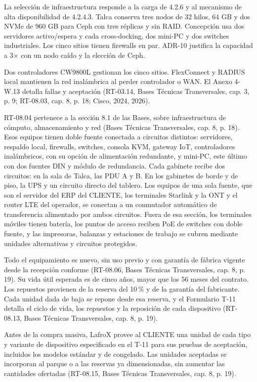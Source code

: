 La selección de infraestructura responde a la carga de 4.2.6 y al mecanismo de alta disponibilidad de 4.2.4.3. Talca conserva tres nodos de 32 hilos, 64 GB y dos NVMe de 960 GB para Ceph con tres réplicas y sin RAID. Concepción usa dos servidores activo/espera y cada cross-docking, dos mini-PC y dos switches industriales. Los cinco sitios tienen firewalls en par. ADR-10 justifica la capacidad a 3$\times$ con un nodo caído y la elección de Ceph.

Dos controladores CW9800L gestionan los cinco sitios. FlexConnect y RADIUS local mantienen la red inalámbrica al perder controlador o WAN. El Anexo 4-W.13 detalla fallas y aceptación (RT-03.14, Bases Técnicas Transversales, cap. 3, p. 9; RT-08.03, cap. 8, p. 18; Cisco, 2024, 2026).

RT-08.04 pertenece a la sección 8.1 de las Bases, sobre infraestructura de cómputo, almacenamiento y red (Bases Técnicas Transversales, cap. 8, p. 18). Esos equipos tienen doble fuente conectada a circuitos distintos: servidores, respaldo local, firewalls, switches, consola KVM, gateway IoT, controladores inalámbricos, con su opción de alimentación redundante, y mini-PC, este último con dos fuentes DIN y módulo de redundancia. Cada gabinete recibe dos circuitos: en la sala de Talca, las PDU A y B. En los gabinetes de borde y de piso, la UPS y un circuito directo del tablero. Los equipos de una sola fuente, que son el servidor del ERP del CLIENTE, los terminales Starlink y la ONT y el router LTE del operador, se conectan a un conmutador automático de transferencia alimentado por ambos circuitos. Fuera de esa sección, los terminales móviles tienen batería, los puntos de acceso reciben PoE de switches con doble fuente, y las impresoras, balanzas y estaciones de trabajo se cubren mediante unidades alternativas y circuitos protegidos.

Todo el equipamiento es nuevo, sin uso previo y con garantía de fábrica vigente desde la recepción conforme (RT-08.06, Bases Técnicas Transversales, cap. 8, p. 19). Su vida útil esperada es de cinco años, mayor que los 56 meses del contrato. Los repuestos provienen de la reserva del 10\,\% y de la garantía del fabricante. Cada unidad dada de baja se repone desde esa reserva, y el Formulario T-11 detalla el ciclo de vida, los repuestos y la reposición de cada dispositivo (RT-08.13, Bases Técnicas Transversales, cap. 8, p. 19).

Antes de la compra masiva, LafroX provee al CLIENTE una unidad de cada tipo y variante de dispositivo especificado en el T-11 para sus pruebas de aceptación, incluidos los modelos estándar y de congelado. Las unidades aceptadas se incorporan al parque o a las reservas ya dimensionadas, sin aumentar las cantidades ofertadas (RT-08.15, Bases Técnicas Transversales, cap. 8, p. 19).

